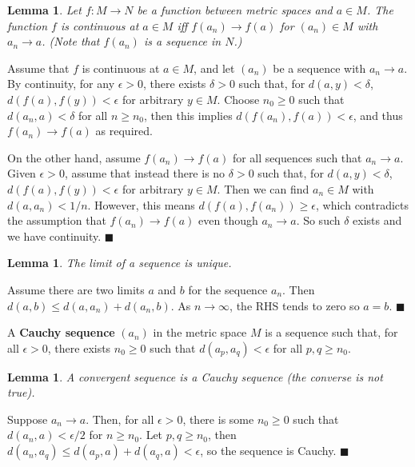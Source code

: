 \documentclass[letter-paper]{tufte-book}
\newtheorem{lemma}[theorem]{\color{pastel-blue}Lemma}
\newenvironment{proof}[1][Proof]{\begin{trivlist}
\item[\hskip \labelsep {\bfseries #1}]}{\end{trivlist}}
\newcommand{\qed}{\hfill$\blacksquare$}
\begin{document}
\begin{lemma}
  Let $f : M \to N$ be a function between metric spaces and $a \in M$. The
  function $f$ is continuous at $a \in M$ iff $f(a_n) \to f(a)$ for $(a_n) \in
  M$ with $a_n \to a$. (Note that $f(a_n)$ is a sequence in $N$.)
\end{lemma}

\begin{proof}
  Assume that $f$ is continuous at $a \in M$, and let $(a_n)$ be a sequence with
  $a_n \to a$. By continuity, for any $\epsilon > 0$, there exists $\delta > 0$
  such that, for $d(a, y) < \delta$, $d(f(a), f(y)) <\epsilon$ for arbitrary $y
  \in M$. Choose $n_0 \geq 0$ such that $d(a_n, a) < \delta$ for all $n\geq
  n_0$, then this implies $d(f(a_n), f(a)) < \epsilon$, and thus $f(a_n) \to
  f(a)$ as required.
  
  On the other hand, assume $f(a_n) \to f(a)$ for all sequences such that $a_n
  \to a$. Given $\epsilon > 0$, assume that instead there is no $\delta > 0$
  such that, for $d(a, y) < \delta$, $d(f(a), f(y)) <\epsilon$ for arbitrary $y
  \in M$. Then we can find $a_n \in M$ with $d(a, a_n) < 1/n$. However, this
  means $d(f(a), f(a_n)) \geq \epsilon$, which contradicts the assumption that
  $f(a_n) \to f(a)$ even though $a_n \to a$. So such $\delta$ exists and we have
  continuity. \qed
\end{proof}

\begin{lemma}
  The limit of a sequence is unique.
\end{lemma}

\begin{proof}
  Assume there are two limits $a$ and $b$ for the sequence $a_n$. Then $d(a,b)
  \leq d(a, a_n) + d(a_n, b)$. As $n\to\infty$, the RHS tends to zero so $a =
  b$. \qed
\end{proof}

A \textbf{Cauchy sequence} $(a_n)$ in the metric space $M$ is a sequence such
that, for all $\epsilon > 0$, there exists $n_0 \geq 0$ such that $d(a_p, a_q) <
\epsilon$ for all $p, q \geq n_0$.

\begin{lemma}
  A convergent sequence is a Cauchy sequence (the converse is not true).
\end{lemma}

\begin{proof}
  Suppose $a_n \to a$. Then, for all $\epsilon > 0$, there is some $n_0 \geq 0$
  such that $d(a_n, a) < \epsilon / 2$ for $n \geq n_0$. Let $p, q \geq n_0$,
  then $d(a_n, a_q) \leq d(a_p, a) + d(a_q, a) < \epsilon$, so the sequence is
  Cauchy. \qed
\end{proof}
\end{document}
